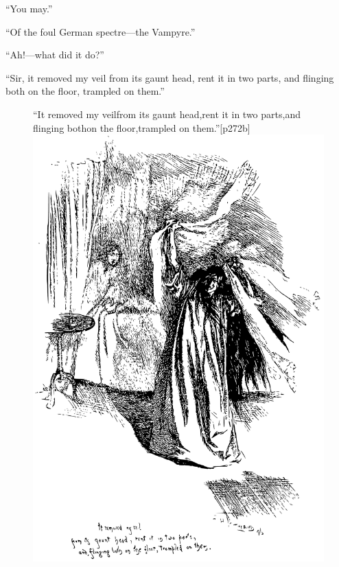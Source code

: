 \enquote{You may.}

\enquote{Of the foul German spectre---the Vampyre.}

\enquote{Ah!---what did it do?}

\enquote{Sir, it removed my veil from its gaunt head, rent it in two
parts, and flinging both on the floor, trampled on them.}

\begin{figure}
	\begin{sidecaption}{\enquote{It removed my veil\linebreak from its gaunt head,\linebreak rent it in two parts,\linebreak and flinging both\linebreak on the floor,\linebreak trampled on them.}}[p272b]
		\centering
		\includegraphics[width=\linewidth]{images/p272b.pdf}
	\end{sidecaption}
\end{figure}

